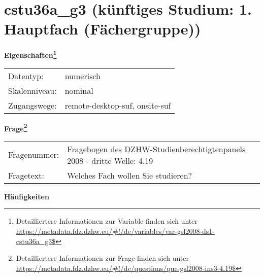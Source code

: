 
    \setcounter{footnote}{0}

    \vspace*{-1.8cm}
	\section{cstu36a\_g3 (künftiges Studium: 1. Hauptfach (Fächergruppe))}
	\label{section:cstu36a_g3}



    \vspace*{0.5cm}
    \noindent\textbf{Eigenschaften\footnote{Detailliertere Informationen zur Variable finden sich unter
		\url{https://metadata.fdz.dzhw.eu/\#!/de/variables/var-gsl2008-ds1-cstu36a_g3$}}}\\
	\begin{tabularx}{\hsize}{@{}lX}
	Datentyp: & numerisch \\
	Skalenniveau: & nominal \\
	Zugangswege: &
	  remote-desktop-suf, 
	  onsite-suf
 \\
    \end{tabularx}



				\vspace*{0.5cm}
                \noindent\textbf{Frage\footnote{Detailliertere Informationen zur Frage finden sich unter
		              \url{https://metadata.fdz.dzhw.eu/\#!/de/questions/que-gsl2008-ins3-4.19$}}}\\
				\begin{tabularx}{\hsize}{@{}lX}
					Fragenummer: &
					  Fragebogen des DZHW-Studienberechtigtenpanels 2008 - dritte Welle:
					  4.19
 \\
					Fragetext: & Welches Fach wollen Sie studieren? \\
				\end{tabularx}





        		\vspace*{0.5cm}
                \noindent\textbf{Häufigkeiten}

